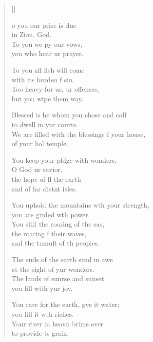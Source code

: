 \settowidth{\versewidth}{We are filled with the blessings of your house, *}
\begin{verse}[\versewidth]
  \begin{patverse}
o you our prise is due\Med\\
in Zion,  God.\\
To you we py our vows,\Med\\
you who hear ur prayer.

To you all flsh will come\Med\\
with its burden f sin.\\
Too heavy for us, ur offenses,\Med\\
but you wipe them way.

Blessed is he whom you chose and call\Med\\
to dwell in yur courts.\\
We are filled with the blessings f your house,\Med\\
of your hol temple.

You keep your pldge with wonders,\Med\\
O God ur savior,\\
the hope of ll the earth\Med\\
and of far distnt isles.

You uphold the mountains w\pointup{\i}th your strength,\Med\\
you are girded w\pointup{\i}th power.\\
You still the roaring of the sas,\Flex\\
the roaring f their waves,\Med\\
and the tumult of th peoples.

The ends of the earth stnd in awe\Med\\
at the sight of yur wonders.\\
The lands of sunr\pointup{\i}se and sunset\Med\\
you fill with yur joy.

You care for the earth, g\pointup{\i}ve it water;\Med\\
you fill it w\pointup{\i}th riches.\\
Your river in heavn brims over\Med\\
to provide \pointup{\i}ts grain.


\end{patverse}
\end{verse}
